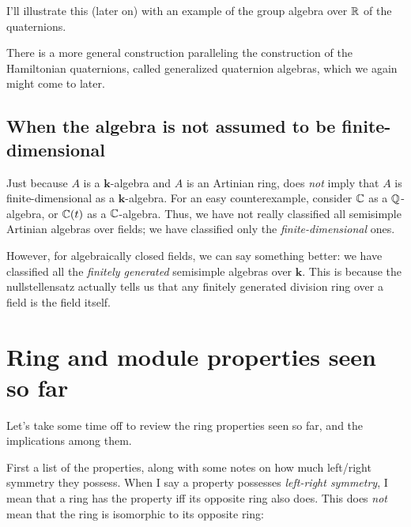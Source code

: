 \documentclass[a4paper]{amsart}
\newcommand{\field}{\mathbf{k}}
\begin{document}
I'll illustrate this (later on) with an example of the group algebra
over $\mathbb{R}$ of the quaternions.

There is a more general construction paralleling the construction of
the Hamiltonian quaternions, called generalized quaternion algebras,
which we again might come to later.

\subsection{When the algebra is not assumed to be finite-dimensional}

Just because $A$ is a $\field$-algebra and $A$ is an Artinian ring,
does {\em not} imply that $A$ is finite-dimensional as a
$\field$-algebra. For an easy counterexample, consider $\mathbb{C}$ as a
$\mathbb{Q}$-algebra, or $\mathbb{C}(t)$ as a $\mathbb{C}$-algebra. Thus, we have not really
classified all semisimple Artinian algebras over fields; we have
classified only the {\em finite-dimensional} ones.

However, for algebraically closed fields, we can say something better:
we have classified all the {\em finitely generated} semisimple
algebras over $\field$. This is because the nullstellensatz actually
tells us that any finitely generated division ring over a field is the
field itself.

\section{Ring and module properties seen so far}

Let's take some time off to review the ring properties seen so far,
and the implications among them.

First a list of the properties, along with some notes on how much
left/right symmetry they possess. When I say a property possesses {\em
  left-right symmetry}, I mean that a ring has the property iff its
opposite ring also does. This does {\em not} mean that the ring is
isomorphic to its opposite ring:
\end{document}
